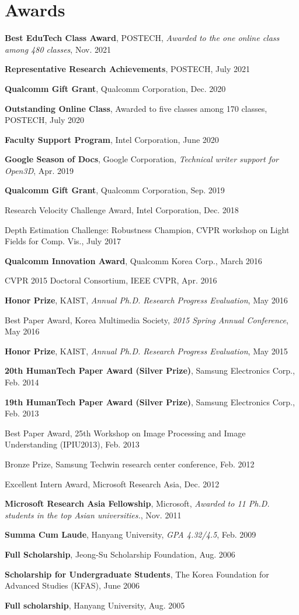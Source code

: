 \documentclass[letterpaper,11pt]{article}
\newcommand{\resumeItem}[1]{
  \small{
  \item{#1 \vspace{-2pt}}
  }
}
\newcommand{\resumeItemListStart}{\begin{itemize}}
\newcommand{\resumeItemListEnd}{\end{itemize}\vspace{-5pt}}
\begin{document}
\section{Awards}
\resumeItemListStart
    \resumeItem{\textbf{Best EduTech Class Award}, POSTECH, \emph{Awarded to the one online class among 480 classes}, Nov. 2021}
    \resumeItem{\textbf{Representative Research Achievements}, POSTECH, July 2021}
    \resumeItem{\textbf{Qualcomm Gift Grant}, Qualcomm Corporation, Dec. 2020}
    \resumeItem{\textbf{Outstanding Online Class}, Awarded to five classes among 170 classes, POSTECH, July 2020}
    \resumeItem{\textbf{Faculty Support Program}, Intel Corporation, June 2020}
    \resumeItem{\textbf{Google Season of Docs}, Google Corporation, \emph{Technical writer support for Open3D}, Apr. 2019}
    \resumeItem{\textbf{Qualcomm Gift Grant}, Qualcomm Corporation, Sep. 2019}
    \resumeItem{Research Velocity Challenge Award, Intel Corporation, Dec. 2018}
    \resumeItem{Depth Estimation Challenge: Robustness Champion, CVPR workshop on Light Fields for Comp. Vis., July 2017}
    \resumeItem{\textbf{Qualcomm Innovation Award}, Qualcomm Korea Corp., March 2016}
    \resumeItem{CVPR 2015 Doctoral Consortium, IEEE CVPR, Apr. 2016}
    \resumeItem{\textbf{Honor Prize}, KAIST, \emph{Annual Ph.D. Research Progress Evaluation}, May 2016}
    \resumeItem{Best Paper Award, Korea Multimedia Society, \emph{2015 Spring Annual Conference}, May 2016}
    \resumeItem{\textbf{Honor Prize}, KAIST, \emph{Annual Ph.D. Research Progress Evaluation}, May 2015}
    \resumeItem{\textbf{20th HumanTech Paper Award (Silver Prize)}, Samsung Electronics Corp., Feb. 2014}
    \resumeItem{\textbf{19th HumanTech Paper Award (Silver Prize)}, Samsung Electronics Corp., Feb. 2013}
    \resumeItem{Best Paper Award, 25th Workshop on Image Processing and Image Understanding (IPIU2013), Feb. 2013}
    \resumeItem{Bronze Prize, Samsung Techwin research center conference, Feb. 2012}
    \resumeItem{Excellent Intern Award, Microsoft Research Asia, Dec. 2012}
    \resumeItem{\textbf{Microsoft Research Asia Fellowship}, Microsoft, \emph{Awarded to 11 Ph.D. students in the top Asian universities.}, Nov. 2011}
    \resumeItem{\textbf{Summa Cum Laude}, Hanyang University, \emph{GPA 4.32/4.5}, Feb. 2009}
    \resumeItem{\textbf{Full Scholarship}, Jeong-Su Scholarship Foundation, Aug. 2006}
    \resumeItem{\textbf{Scholarship for Undergraduate Students}, The Korea Foundation for Advanced Studies (KFAS), June 2006}
    \resumeItem{\textbf{Full scholarship}, Hanyang University, Aug. 2005}
\resumeItemListEnd
\end{document}
